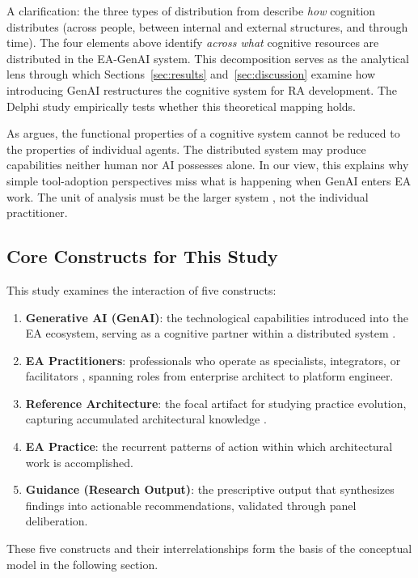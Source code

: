 A clarification: the three types of distribution from
\textcite{hollan_distributed_2000} describe \emph{how} cognition distributes
(across people, between internal and external structures, and through time).
The four elements above identify \emph{across what} cognitive resources are
distributed in the EA-GenAI system. This decomposition serves as the analytical
lens through which Sections~\ref{sec:results} and~\ref{sec:discussion} examine
how introducing GenAI restructures the cognitive system for RA development. The
Delphi study empirically tests whether this theoretical mapping holds.

As \textcite{hutchins_cognition_1995} argues, the functional properties of a
cognitive system cannot be reduced to the properties of individual agents. The
distributed system may produce capabilities neither human nor AI possesses
alone. In our view, this explains why simple tool-adoption perspectives miss
what is happening when GenAI enters EA work. The unit of analysis must be the
larger system \parencite{hollan_distributed_2000}, not the individual
practitioner.

\subsection{Core Constructs for This Study}\label{subsec:coreelements}

This study examines the interaction of five constructs:

\begin{enumerate}
      \item \textbf{Generative AI (GenAI)}: the technological capabilities
            introduced into the EA ecosystem, serving as a cognitive partner
            within a distributed system
            \parencite{hutchins_cognition_1995, vaswani_attention_2017}.
      \item \textbf{EA Practitioners}: professionals who operate as specialists,
            integrators, or facilitators
            \parencite{saint-louis_investigation_2019}, spanning roles from
            enterprise architect to platform engineer.
      \item \textbf{Reference Architecture}: the focal artifact for studying
            practice evolution, capturing accumulated architectural knowledge
            \parencite{cloutier_concept_2010}.
      \item \textbf{EA Practice}: the recurrent patterns of action
            \parencite{feldman_theorizing_2011} within which architectural work
            is accomplished.
      \item \textbf{Guidance (Research Output)}: the prescriptive output that
            synthesizes findings into actionable recommendations, validated
            through panel deliberation.
\end{enumerate}

These five constructs and their interrelationships form the basis of the
conceptual model in the following section.
